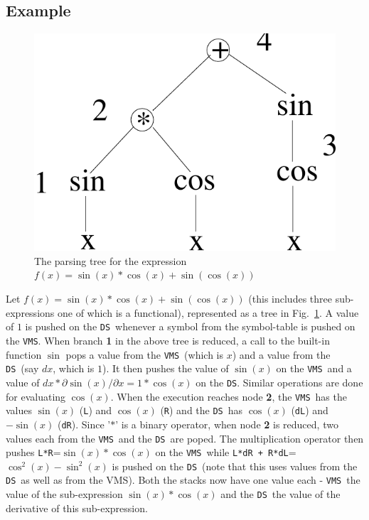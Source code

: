 \documentclass[12pt]{article}
\newcommand{\DS}{{\tt DS}}
\newcommand{\VMS}{{\tt VMS}}
\begin{document}
\subsection{Example}
\begin{figure}[t]
\begin{center}
  \includegraphics[scale=0.45]{Figs/fig1}
\caption[]{The parsing tree for the expression $f(x)=\sin(x)*\cos(x) + \sin(\cos(x))$}
\label{EX1}
\end{center}
\end{figure}
Let $f(x)=\sin(x)*\cos(x) + \sin(\cos(x))$ (this includes three
sub-expressions one of which is a functional), represented as a tree
in Fig.~\ref{EX1}.  A value of $1$ is pushed on the \DS\ whenever a
symbol from the symbol-table is pushed on the \VMS.  When branch {\bf
1} in the above tree is reduced, a call to the built-in function
$\sin$ pops a value from the \VMS\ (which is $x$) and a value from the
\DS\ (say $dx$, which is $1$).  It then pushes the value of $\sin(x)$
on the \VMS\ and a value of $dx*\partial \sin(x) / \partial x =
1*\cos(x)$ on the \DS.  Similar operations are done for evaluating
$\cos(x)$.  When the execution reaches node {\bf 2}, the \VMS\ has the
values $\sin(x)$ ({\tt L}) and $\cos(x)$ ({\tt R}) and the \DS\ has
$\cos(x)$ ({\tt dL}) and $-\sin(x)$ ({\tt dR}).  Since '$*$' is a
binary operator, when node {\bf 2} is reduced, two values each from
the \VMS\ and the \DS\ are poped.  The multiplication operator then
pushes {\tt L*R}=$\sin(x)*\cos(x)$ on the \VMS\ while {\tt L*dR +
R*dL}=$\cos^2(x)-\sin^2(x)$ is pushed on the \DS\ (note that this uses
values from the \DS\ as well as from the VMS).  Both the stacks now
have one value each - \VMS\ the value of the sub-expression
$\sin(x)*\cos(x)$ and the \DS\ the value of the derivative of this
sub-expression.
\end{document}
